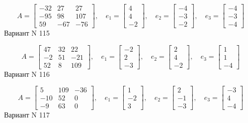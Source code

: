 \documentclass[11pt]{report}
\begin{document}
$$A = \left[\begin{matrix}-32 & 27 & 27\\-95 & 98 & 107\\59 & -67 & -76\end{matrix}\right],\quad e_1 = \left[\begin{matrix}4\\4\\-2\end{matrix}\right],\quad e_2 = \left[\begin{matrix}-4\\-3\\-2\end{matrix}\right],\quad e_3 = \left[\begin{matrix}-4\\-3\\-4\end{matrix}\right]$$Вариант N 115

$$A = \left[\begin{matrix}47 & 32 & 22\\-2 & 51 & -21\\52 & 8 & 109\end{matrix}\right],\quad e_1 = \left[\begin{matrix}-2\\2\\-3\end{matrix}\right],\quad e_2 = \left[\begin{matrix}2\\4\\-2\end{matrix}\right],\quad e_3 = \left[\begin{matrix}1\\1\\-4\end{matrix}\right]$$Вариант N 116

$$A = \left[\begin{matrix}5 & 109 & -36\\-10 & 52 & 0\\-9 & 63 & 0\end{matrix}\right],\quad e_1 = \left[\begin{matrix}1\\-2\\3\end{matrix}\right],\quad e_2 = \left[\begin{matrix}2\\-1\\-3\end{matrix}\right],\quad e_3 = \left[\begin{matrix}-3\\4\\-4\end{matrix}\right]$$Вариант N 117
\end{document}
